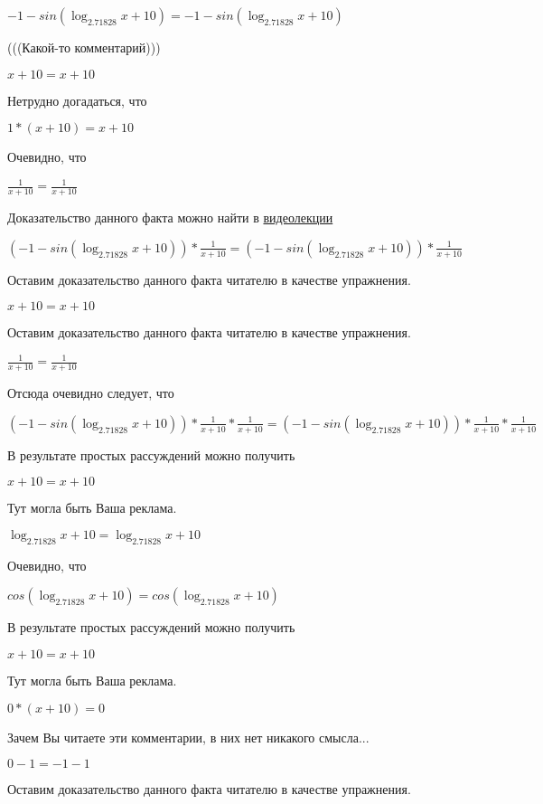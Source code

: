 \documentclass[12pt,a4paper,fleqn]{article}
\theoremstyle{definition}
\begin{document}
$ -1  - sin(\log_{ 2.71828 }{ x  +  10 }) =  -1  - sin(\log_{ 2.71828 }{ x  +  10 })$

(((Какой-то комментарий)))

$ x  +  10  =  x  +  10 $

Нетрудно догадаться, что

$ 1  * ( x  +  10 ) =  x  +  10 $

Очевидно, что

$\frac{ 1 }{ x  +  10 }
 = \frac{ 1 }{ x  +  10 }
$

Доказательство данного факта можно найти в \href{https://www.youtube.com/watch?v=dQw4w9WgXcQ}{видеолекции}

$( -1  - sin(\log_{ 2.71828 }{ x  +  10 })) * \frac{ 1 }{ x  +  10 }
 = ( -1  - sin(\log_{ 2.71828 }{ x  +  10 })) * \frac{ 1 }{ x  +  10 }
$

Оставим доказательство данного факта читателю в качестве упражнения.

$ x  +  10  =  x  +  10 $

Оставим доказательство данного факта читателю в качестве упражнения.

$\frac{ 1 }{ x  +  10 }
 = \frac{ 1 }{ x  +  10 }
$

Отсюда очевидно следует, что

$( -1  - sin(\log_{ 2.71828 }{ x  +  10 })) * \frac{ 1 }{ x  +  10 }
 * \frac{ 1 }{ x  +  10 }
 = ( -1  - sin(\log_{ 2.71828 }{ x  +  10 })) * \frac{ 1 }{ x  +  10 }
 * \frac{ 1 }{ x  +  10 }
$

В результате простых рассуждений можно получить

$ x  +  10  =  x  +  10 $

Тут могла быть Ваша реклама.

$\log_{ 2.71828 }{ x  +  10 } = \log_{ 2.71828 }{ x  +  10 }$

Очевидно, что

$cos(\log_{ 2.71828 }{ x  +  10 }) = cos(\log_{ 2.71828 }{ x  +  10 })$

В результате простых рассуждений можно получить

$ x  +  10  =  x  +  10 $

Тут могла быть Ваша реклама.

$ 0  * ( x  +  10 ) =  0 $

Зачем Вы читаете эти комментарии, в них нет никакого смысла...

$ 0  -  1  =  -1  -  1 $

Оставим доказательство данного факта читателю в качестве упражнения.
\end{document}
